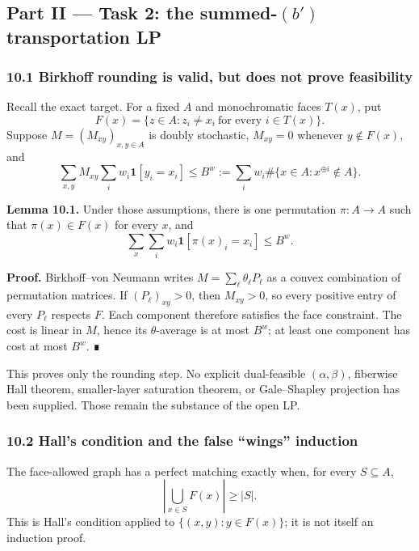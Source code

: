 \subsection{\texorpdfstring{Part II --- Task 2: the summed-\((b')\) transportation LP}{Part II --- Task 2: the summed-(b\textquotesingle) transportation LP}}\label{part-ii-task-2-the-summed-b-transportation-lp}

\subsubsection{10.1 Birkhoff rounding is valid, but does not prove feasibility}\label{birkhoff-rounding-is-valid-but-does-not-prove-feasibility}

Recall the exact target. For a fixed \(A\) and monochromatic faces \(T(x)\), put
\[F(x)=\{z\in A:z_i\ne x_i\ \text{for every }i\in T(x)\}.\]
Suppose \(M=(M_{xy})_{x,y\in A}\) is doubly stochastic, \(M_{xy}=0\) whenever \(y\notin F(x)\), and
\[\sum_{x,y}M_{xy}\sum_iw_i\mathbf1[y_i=x_i]
\le B^w:=\sum_iw_i\#\{x\in A:x^{\oplus i}\notin A\}.\]

\textbf{Lemma 10.1.} Under those assumptions, there is one permutation \(\pi:A\to A\) such that \(\pi(x)\in F(x)\) for every \(x\), and
\[\sum_x\sum_iw_i\mathbf1[\pi(x)_i=x_i]\le B^w.\]

\textbf{Proof.} Birkhoff--von Neumann writes \(M=\sum_\ell\theta_\ell P_\ell\) as a convex combination of permutation matrices. If \((P_\ell)_{xy}>0\), then \(M_{xy}>0\), so every positive entry of every \(P_\ell\) respects \(F\). Each component therefore satisfies the face constraint. The cost is linear in \(M\), hence its \(\theta\)-average is at most \(B^w\); at least one component has cost at most \(B^w\). ∎

This proves only the rounding step. No explicit dual-feasible \((\alpha,\beta)\), fiberwise Hall theorem, smaller-layer saturation theorem, or Gale--Shapley projection has been supplied. Those remain the substance of the open LP.

\subsubsection{10.2 Hall's condition and the false ``wings'' induction}\label{halls-condition-and-the-false-wings-induction}

The face-allowed graph has a perfect matching exactly when, for every \(S\subseteq A\),
\[\left|\bigcup_{x\in S}F(x)\right|\ge|S|.\]
This is Hall's condition applied to \(\{(x,y):y\in F(x)\}\); it is not itself an induction proof.

